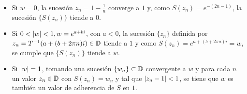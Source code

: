 \begin{itemize}
    \item Si $w = 0$, la sucesión $z_n = 1 - \frac{1}{n}$ converge a $1$ y, como $S(z_n) = e^{-(2n-1)}$, la sucesión $\{S(z_n)\}$ tiende a 0.

    \item Si $0 < \left\lvert w\right\rvert < 1, w = e^{a+bi}$, con $a < 0$, la sucesión $\{z_n\}$ definida por $z_n = T^{-1}(a + (b+2 \pi n)i) \in \mathbb{D}$ tiende a $1$ y como $S(z_n) = e^{a+(b+ 2 \pi n)i} = w$, se cumple que $\{S(z_n)\}$ tiende a $w$.

    \item Si $\left\lvert w\right\rvert = 1$, tomando una sucesión $\{w_n\} \subset \mathbb{D}$ convergente a $w$ y para cada $n$ un valor $z_n \in \mathbb{D}$ con $S(z_n) = w_n$ y tal que $\left\lvert z_n - 1\right\rvert < 1$, se tiene que $w$ es también un valor de adherencia de $S$ en $1$.
\end{itemize}

